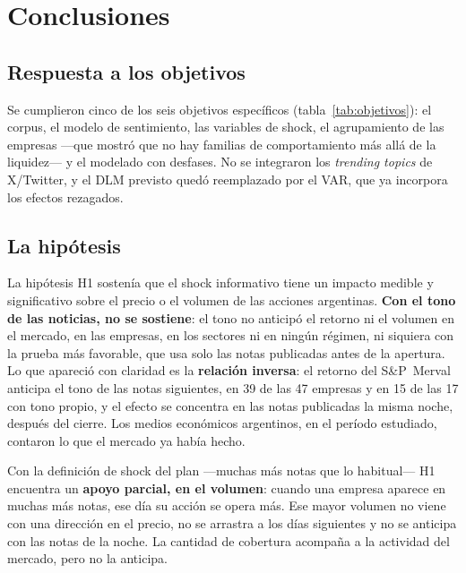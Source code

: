 \chapter{Conclusiones}
\label{cap:conclusiones}

\section{Respuesta a los objetivos}

Se cumplieron cinco de los seis objetivos específicos (tabla~\ref{tab:objetivos}): el corpus, el
modelo de sentimiento, las variables de shock, el agrupamiento de las empresas —que mostró que no
hay familias de comportamiento más allá de la liquidez— y el modelado con desfases. No se
integraron los \textit{trending topics} de X/Twitter, y el DLM previsto quedó reemplazado por el
VAR, que ya incorpora los efectos rezagados.

\section{La hipótesis}

La hipótesis H1 sostenía que el shock informativo tiene un impacto medible y significativo
sobre el precio o el volumen de las acciones argentinas. \textbf{Con el tono de las noticias,
no se sostiene}: el tono no anticipó el retorno ni el volumen en el mercado, en las empresas,
en los sectores ni en ningún régimen, ni siquiera con la prueba más favorable, que usa solo las
notas publicadas antes de la apertura. Lo que apareció con claridad es la \textbf{relación
inversa}: el retorno del S\&P~Merval anticipa el tono de las notas siguientes, en 39 de las 47
empresas y en 15 de las 17 con tono propio, y el efecto se concentra en las notas publicadas la
misma noche, después del cierre. Los medios económicos argentinos, en el período estudiado,
contaron lo que el mercado ya había hecho.

Con la definición de shock del plan —muchas más notas que lo habitual— H1 encuentra un
\textbf{apoyo parcial, en el volumen}: cuando una empresa aparece en muchas más notas, ese día
su acción se opera más. Ese mayor volumen no viene con una dirección en el precio, no se
arrastra a los días siguientes y no se anticipa con las notas de la noche. La cantidad de
cobertura acompaña a la actividad del mercado, pero no la anticipa.

